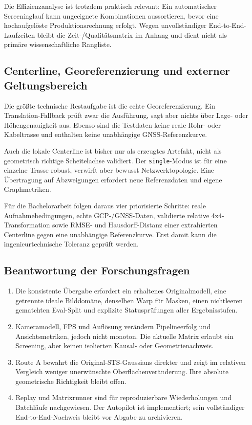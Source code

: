 Die Effizienzanalyse ist trotzdem praktisch relevant: Ein automatischer
Screeninglauf kann ungeeignete Kombinationen aussortieren, bevor eine
hochaufgelöste Produktionsrechnung erfolgt. Wegen unvollständiger
End-to-End-Laufzeiten bleibt die Zeit-/Qualitätsmatrix im Anhang und dient nicht
als primäre wissenschaftliche Rangliste.

\subsection{Centerline, Georeferenzierung und externer Geltungsbereich}

Die größte technische Restaufgabe ist die echte Georeferenzierung. Ein
Translation-Fallback prüft zwar die Ausführung, sagt aber nichts über Lage-
oder Höhengenauigkeit aus. Ebenso sind die Testdaten keine reale Rohr- oder
Kabeltrasse und enthalten keine unabhängige GNSS-Referenzkurve.

Auch die lokale Centerline ist bisher nur als erzeugtes Artefakt, nicht als
geometrisch richtige Scheitelachse validiert. Der \texttt{single}-Modus ist für
eine einzelne Trasse robust, verwirft aber bewusst Netzwerktopologie. Eine
Übertragung auf Abzweigungen erfordert neue Referenzdaten und eigene
Graphmetriken.

Für die Bachelorarbeit folgen daraus vier priorisierte Schritte: reale
Aufnahmebedingungen, echte GCP-/GNSS-Daten, validierte relative
4x4-Transformation sowie RMSE- und Hausdorff-Distanz einer extrahierten
Centerline gegen eine unabhängige Referenzkurve. Erst damit kann die
ingenieurtechnische Toleranz geprüft werden.

\subsection{Beantwortung der Forschungsfragen}

\begin{enumerate}
  \item Die konsistente Übergabe erfordert ein erhaltenes Originalmodell, eine
	  getrennte ideale Bilddomäne, denselben Warp für Masken, einen
	  nichtleeren gematchten Eval-Split und explizite Statusprüfungen aller
	  Ergebnisstufen.
  \item Kameramodell, FPS und Auflösung verändern Pipelineerfolg und
	  Ansichtsmetriken, jedoch nicht monoton. Die aktuelle Matrix erlaubt ein
	  Screening, aber keinen isolierten Kausal- oder Geometrienachweis.
  \item Route A bewahrt die Original-STS-Gaussians direkter und zeigt im
	  relativen Vergleich weniger unerwünschte Oberflächenveränderung. Ihre
	  absolute geometrische Richtigkeit bleibt offen.
  \item Replay und Matrixrunner sind für reproduzierbare Wiederholungen und
	  Batchläufe nachgewiesen. Der Autopilot ist implementiert; sein
	  vollständiger End-to-End-Nachweis bleibt vor Abgabe zu archivieren.
\end{enumerate}
